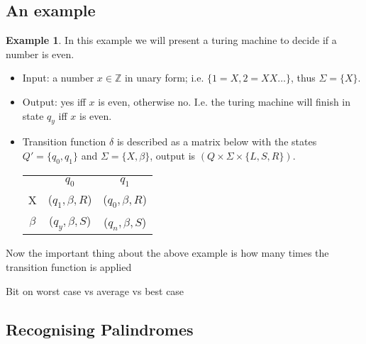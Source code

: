 \documentclass{article}
\theoremstyle{definition}
\newtheorem{example}{Example}[section]
\begin{document}
\subsection{An example}
\begin{example}
	In this example we will present a turing machine to decide if a number is even.
	\begin{itemize}
		\item Input: a number $x \in \mathbb{Z}$ in unary form; i.e. $\{1 = X, 2 = XX\dots\}$,
			thus $\Sigma = \{X\}$.
		\item Output: yes iff $x$ is even, otherwise no. I.e. the turing machine will finish
			in state $q_y$ iff $x$ is even.
		\item Transition function $\delta$ is described as a matrix below with the states
			$Q\prime = \{q_0,q_1\}$ and $\Sigma = \{X,\beta\}$,
			output is $(Q \times \Sigma \times \{L,S,R\})$.
		\begin{center}
			\begin{tabular}{ c c c }
					 & $q_0$           & $q_1$           \\
				X    & ($q_1,\beta,R$) & ($q_0,\beta,R$) \\
			 $\beta$ & ($q_y,\beta,S$) & ($q_n,\beta,S$) \\
			\end{tabular}
		\end{center}
	\end{itemize}
\end{example}

Now the important thing about the above example is how many times the transition function is applied

Bit on worst case vs average vs best case

\subsection{Recognising Palindromes}
\end{document}
